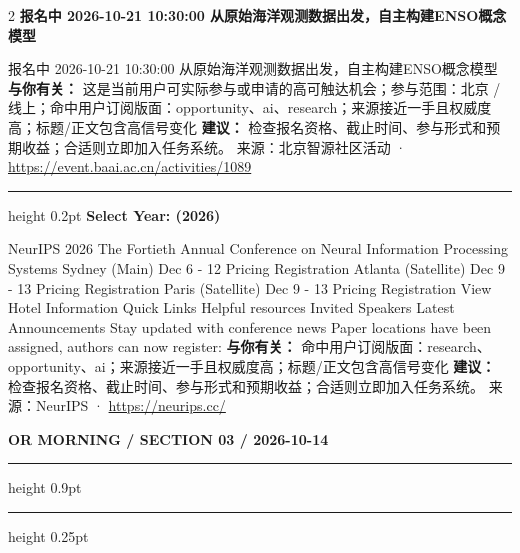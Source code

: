 \documentclass[10.5pt]{ctexart}
\begin{document}
\begin{multicols}{2}
\vspace{2mm}
{\large\bfseries 报名中 2026-10-21 10:30:00 从原始海‮观洋‬测数据出发，自主构建ENSO概念模型}\par
报名中 2026-10-21 10:30:00 从原始海‮观洋‬测数据出发，自主构建ENSO概念模型
\textbf{与你有关：} 这是当前用户可实际参与或申请的高可触达机会；参与范围：北京 / 线上；命中用户订阅版面：opportunity、ai、research；来源接近一手且权威度高；标题/正文包含高信号变化
\textbf{建议：} 检查报名资格、截止时间、参与形式和预期收益；合适则立即加入任务系统。
{\footnotesize\color{ormuted} 来源：北京智源社区活动 · \url{https://event.baai.ac.cn/activities/1089}}
\vspace{2mm}
\hrule height 0.2pt
\vspace{2mm}
{\large\bfseries Select Year: (2026)}\par
NeurIPS 2026 The Fortieth Annual Conference on Neural Information Processing Systems Sydney (Main) Dec 6 - 12 Pricing Registration Atlanta (Satellite) Dec 9 - 13 Pricing Registration Paris (Satellite) Dec 9 - 13 Pricing Registration View Hotel Information Quick Links Helpful resources Invited Speakers Latest Announcements Stay updated with conference news Paper locations have been assigned, authors can now register: 
\textbf{与你有关：} 命中用户订阅版面：research、opportunity、ai；来源接近一手且权威度高；标题/正文包含高信号变化
\textbf{建议：} 检查报名资格、截止时间、参与形式和预期收益；合适则立即加入任务系统。
{\footnotesize\color{ormuted} 来源：NeurIPS · \url{https://neurips.cc/}}
\end{multicols}
\newpage
{\small\bfseries OR MORNING / SECTION 03 / 2026-10-14}
\vspace{2mm}
\hrule height 0.9pt
\vspace{1.5mm}
\hrule height 0.25pt
\vspace{4mm}
\end{document}

